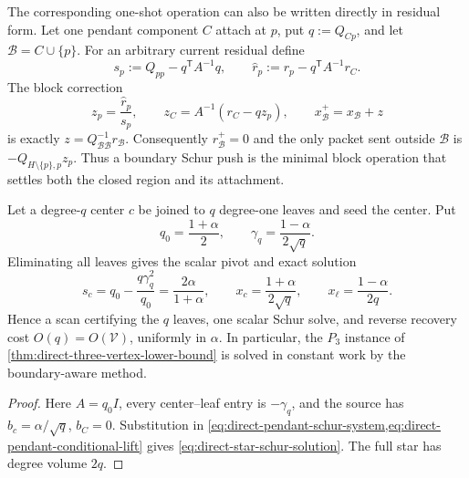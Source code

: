 The corresponding one-shot operation can also be written directly in
residual form.  Let one pendant component $C$ attach at $p$, put
$q:=Q_{Cp}$, and let $\mathcal B=C\cup\{p\}$.  For an arbitrary current
residual define
\begin{equation}
 s_p:=Q_{pp}-q^\mathsf TA^{-1}q,
 \qquad
 \widehat r_p:=r_p-q^\mathsf TA^{-1}r_C.
 \label{eq:direct-boundary-schur-pivot}
\end{equation}
The block correction
\begin{equation}
 z_p=\frac{\widehat r_p}{s_p},
 \qquad
 z_C=A^{-1}(r_C-qz_p),
 \qquad x_{\mathcal B}^+=x_{\mathcal B}+z
 \label{eq:direct-boundary-schur-push}
\end{equation}
is exactly $z=Q_{\mathcal B\mathcal B}^{-1}r_{\mathcal B}$.
Consequently $r_{\mathcal B}^+=0$ and the only packet sent outside
$\mathcal B$ is
$-Q_{H\setminus\{p\},p}z_p$.  Thus a boundary Schur push is the minimal
block operation that settles both the closed region and its attachment.

\begin{corollary}
\label{cor:direct-star-schur-solve}
Let a degree-$q$ center $c$ be joined to $q$ degree-one leaves and seed the
center.  Put
\begin{equation*}
 q_0=\frac{1+\alpha}{2},
 \qquad
 \gamma_q=\frac{1-\alpha}{2\sqrt q}.
\end{equation*}
Eliminating all leaves gives the scalar pivot and exact solution
\begin{equation}
 s_c=q_0-\frac{q\gamma_q^2}{q_0}
     =\frac{2\alpha}{1+\alpha},
 \qquad
 x_c=\frac{1+\alpha}{2\sqrt q},
 \qquad
 x_\ell=\frac{1-\alpha}{2q}.
 \label{eq:direct-star-schur-solution}
\end{equation}
Hence a scan certifying the $q$ leaves, one scalar Schur solve, and reverse
recovery cost $O(q)=O(\mathcal V)$, uniformly in $\alpha$.  In particular,
the $P_3$ instance of \cref{thm:direct-three-vertex-lower-bound} is solved in
constant work by the boundary-aware method.
\end{corollary}

\begin{proof}
Here $A=q_0I$, every center--leaf entry is $-\gamma_q$, and the source has
$b_c=\alpha/\sqrt q$, $b_C=0$.  Substitution in
\cref{eq:direct-pendant-schur-system,eq:direct-pendant-conditional-lift}
gives \cref{eq:direct-star-schur-solution}.  The full star has degree volume
$2q$.
\end{proof}

